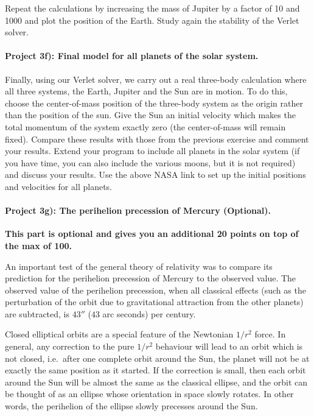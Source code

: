 \documentclass[%
oneside,                 %
final,                   %
10pt]{article}
\begin{document}
Repeat 
the calculations by increasing the mass of Jupiter by a factor of 10 and 1000
 and plot the position of the Earth.  Study again the stability of the Verlet solver.

\paragraph{Project 3f): Final model for all planets of the solar system.}
Finally, using our Verlet solver, we carry out a real three-body calculation where all three systems, 
the Earth, Jupiter and the Sun are in motion. To do this, choose the center-of-mass position of the three-body system as 
the origin rather than the position of the sun. Give the Sun an initial velocity which makes the total momentum of the system exactly zero (the center-of-mass will remain fixed). Compare these results with those from the previous exercise and comment your results. Extend your program to include all planets in the solar system (if you have time, you can also include the various moons, but it is not required) and discuss your results. Use the above NASA link  to set up the initial positions and velocities for all planets. 


\paragraph{Project 3g): The perihelion precession of Mercury (Optional).}
\textbf{This part is optional and gives you an additional 20 points on top of the max of 100.}

An important test of the general theory of relativity was to compare its prediction for the
perihelion precession of Mercury to the observed value. The observed value of the perihelion precession, when
all classical effects (such as the perturbation of the orbit due to gravitational attraction from the other planets) are
subtracted, is $43''$ ($43$ arc seconds) per century.

Closed elliptical orbits are a special feature of the Newtonian $1/r^2$ force. In general, any correction to the
pure $1/r^2$ behaviour will lead to an orbit which is not closed, i.e.~after one complete orbit around the Sun, the
planet will not be at exactly the same position as it started. If the correction is small, then each orbit around
the Sun will be almost the same as the classical ellipse, and the orbit can be thought of as an ellipse whose 
orientation in space slowly rotates. In other words, the perihelion of the ellipse slowly precesses around the Sun.
\end{document}
